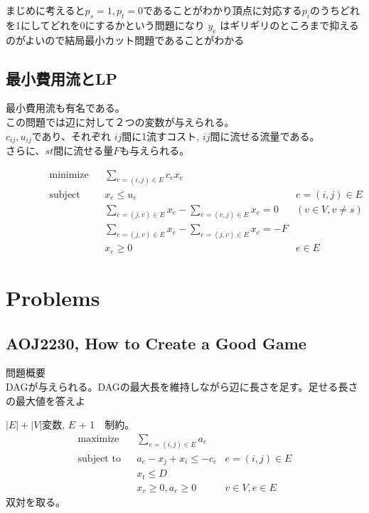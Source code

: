 \documentclass[13pt, a4paper, landscape]{jarticle}
\theoremstyle{nonitalic} %
\begin{document}
まじめに考えると$p_s=1, p_t=0$であることがわかり頂点に対応する$p_i$のうちどれを1にしてどれを0にするかという問題になり $y_e$ はギリギリのところまで抑えるのがよいので結局最小カット問題であることがわかる


\subsection{最小費用流とLP}

最小費用流も有名である。 \\
この問題では辺に対して２つの変数が与えられる。 \\
$c_{ij}, u_{ij}$であり、それぞれ $ij$間に1流すコスト, $ij$間に流せる流量である。 \\
さらに、$st$間に流せる量$F$も与えられる。

\begin{align}
 &&&&&\textrm{minimize}   && \sum_{e=(i,j)\in E} c_e x_e  \\
 &&&&&\textrm{subject to} && x_{e} \leq u_e & e = (i,j) \in E \\
 &&&&&                    && \sum_{e = (j,v) \in E} x_e - \sum_{e=(v,j) \in E} x_e= 0 & (v \in V, v\neq s) &&&&& \\
 &&&&&                    && \sum_{e=(j,v) \in E} x_e - \sum_{e=(j,v)\in E} x_e = -F \\
 &&&&&                    && x_e \geq 0 & e \in E &&&&&
\end{align}




\section{Problems}
\subsection{AOJ2230, How to Create a Good Game}

問題概要 \\
DAGが与えられる。DAGの最大長を維持しながら辺に長さを足す。足せる長さの最大値を答えよ

$|E|+|V|$変数, $E$ + 1　制約。
\begin{align}
 &&&&&\textrm{maximize}   && \sum_{e = (i,j)\in E} a_e \\
 &&&&&\textrm{subject to} && a_e - x_j + x_i \leq - c_e & e = (i,j) \in E  &&&&&\\
 &&&&&                    && x_t \leq  D &&&&&& \\
 &&&&&                    && x_v \geq 0, a_e \geq 0 & v \in V, e \in E &&&&&
\end{align}
双対を取る。
\end{document}
